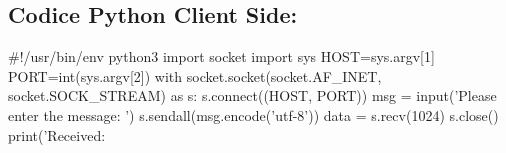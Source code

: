\subsection{Codice Python Client Side:}
\begin{pybox}
#!/usr/bin/env python3
import socket
import sys
HOST=sys.argv[1]
PORT=int(sys.argv[2])
with socket.socket(socket.AF_INET, socket.SOCK_STREAM) as s:
    s.connect((HOST, PORT))
    msg = input('Please enter the message: ')
    s.sendall(msg.encode('utf-8'))
    data = s.recv(1024)
    s.close()
    print('Received: %
\end{pybox}